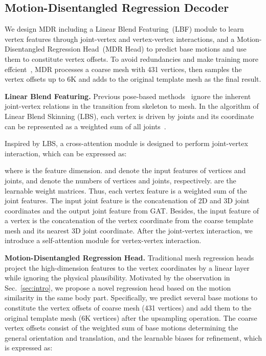 \documentclass{article}
\def\VspacePb{\vspace{-0.20cm}}
\begin{document}
\subsection{Motion-Disentangled Regression Decoder}
\VspacePb

We design MDR including a Linear Blend Featuring~(LBF) module to learn vertex features through joint-vertex and vertex-vertex interactions, and a Motion-Disentangled Regression Head~(MDR Head) to predict base motions and use them to constitute vertex offsets. To avoid redundancies and make training more effcient~\cite{lin2021mesh, lin2021end}, MDR processes a coarse mesh with 431 vertices, then samples the vertex offsets up to 6K and adds to the original template mesh as the final result.

\noindent \textbf{Linear Blend Featuring.} Previous pose-based methods~\cite{choi2020pose2mesh, pqgcn, zheng2021lightweight} ignore the inherent joint-vertex relations in the transition from skeleton to mesh. In the algorithm of Linear Blend Skinning (LBS), each vertex is driven by joints and its coordinate can be represented as a weighted sum of all joints~\cite{jacobson2014skinning, loper2015smpl}.


Inspired by LBS, a cross-attention module is designed to perform joint-vertex interaction, which can be expressed as:
\vspace{-2mm}

\vspace{-5mm}

\sloppy
where  is the feature dimension.  and  denote the input features of vertices and joints,  and  denote the numbers of vertices and joints, respectively.  are the learnable weight matrices. Thus, each vertex feature is a weighted sum of the joint features. The input joint feature  is the concatenation of 2D and 3D joint coordinates and the output joint feature from GAT. Besides, the input feature of a vertex  is the concatenation of the vertex coordinate from the coarse template mesh and its nearest 3D joint coordinate.
After the joint-vertex interaction, we introduce a self-attention module for vertex-vertex interaction. 

\noindent \textbf{Motion-Disentangled Regression Head.} 
Traditional mesh regression heads project the high-dimension features to the vertex coordinates by a linear layer while ignoring the physical plausibility. 
Motivated by the observation in Sec.~\ref{sec:intro}, we propose a novel regression head based on the motion similarity in the same body part. Specifically, we predict several base motions to constitute the vertex offsets of coarse mesh (431 vertices) and add them to the original template mesh (6K vertices) after the upsampling operation. 
The coarse vertex offsets  consist of the weighted sum of base motions determining the general orientation and translation, and the learnable biases for refinement, which is expressed as:
\vspace{-2mm}
\end{document}
